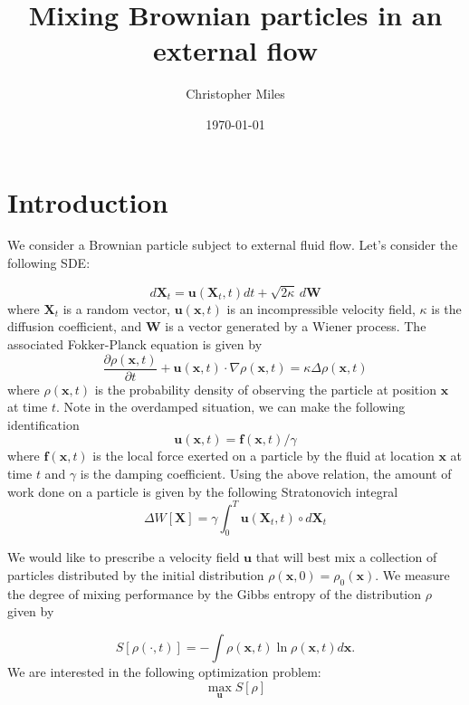 \documentclass[12pt]{article}
\renewcommand{\vec}[1]{\mathbf{#1}}
\begin{document}
\title{Mixing Brownian particles in an external flow}
\author{Christopher Miles}
\date{\today}

\maketitle

\section{Introduction}

We consider a Brownian particle subject to external fluid flow. Let's consider the following SDE:

\begin{equation}
d\vec{X}_{t} = \vec{u}(\vec{X}_{t},t)dt+\sqrt{2\kappa}\, d\vec{W}
\end{equation}
where $\vec{X}_{t}$ is a random vector, $\vec{u}(\vec{x},t)$ is an incompressible velocity field, $\kappa$ is the diffusion coefficient, and $\vec{W}$ is a vector generated by a Wiener process. The associated Fokker-Planck equation is given by 
\begin{equation}
\frac{\partial \rho ( \vec{x},t)}{\partial t}+  \vec{u}(\vec{x},t) \cdot  \nabla \rho(\vec{x},t)  = \kappa \Delta \rho (\vec{x},t)
\end{equation}
where $\rho(\vec{x},t)$ is the probability density of observing the particle at position $\vec{x}$ at time $t$.
 Note in the overdamped situation, we can make the following identification
\begin{equation}
\vec{u}(\vec{x},t) = \vec{f}(\vec{x},t) / \gamma
\end{equation}
where  $\vec{f}(\vec{x},t)$ is the local force exerted on a particle by the fluid at location $\vec{x}$ at time $t$ and $\gamma$ is the damping coefficient. Using the above relation, the amount of work done on a particle is given by the following Stratonovich integral
\begin{equation}
\Delta W[\vec{X}]=  \gamma \int_{0}^{T}\vec{u}(\vec{X}_t, t) \circ d \vec{X}_{t} 
\end{equation}

We would like to prescribe a velocity field $\mathbf{u}$ that will best mix a collection of particles distributed by the initial distribution $\rho(\vec{x},0)=\rho_{0}(\vec{x})$. We measure the degree of mixing performance by the Gibbs entropy of the distribution $\rho$ given by 

\begin{equation}
S[\rho(\cdot, t)] = - \int \rho(\vec{x},t) \ln \rho(\vec{x},t) d\vec{x}.
\end{equation}
 We are interested in the following optimization problem:
\begin{equation}
\max_{\vec{u}} S[\rho]
\end{equation}
\end{document}
